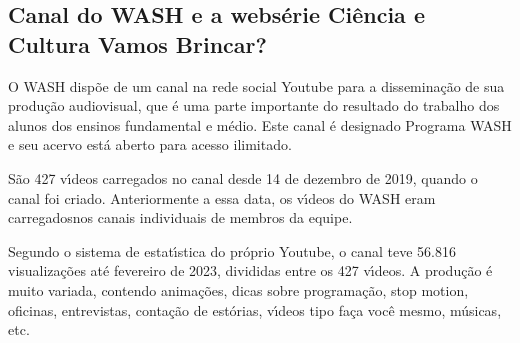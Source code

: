 \documentclass[
12pt,		%
openright,	%
twoside,  %
a4paper,			%
chapter=TITLE,		%
english,			%
french,				%
spanish,			%
brazil				%
]{USPSC-classe/USPSC}
\begin{document}
\subsection[Canal do WASH e a webs\'erie \textquotedbl Ci\^encia e Cultura Vamos Brincar?\textquotedbl ]{Canal do WASH e a webs\'erie \textquotedbl Ci\^encia e Cultura Vamos Brincar?\textquotedbl }\label{Canal do WASH e a webs\'erie \textquotedbl Ci\^encia e Cultura Vamos Brincar?\textquotedbl }
O WASH disp\~oe de um canal na rede social Youtube para a dissemina\c{c}\~ao de sua produ\c{c}\~ao audiovisual, que \'e uma parte importante do resultado do trabalho dos alunos dos ensinos fundamental e m\'edio. Este canal \'e designado \textquotedbl  Programa WASH \textquotedbl  e seu acervo est\'a aberto para acesso ilimitado.

















S\~ao 427 v\'{\i}deos carregados no canal desde 14 de dezembro de 2019, quando o canal foi criado. Anteriormente a essa data, os v\'{\i}deos do WASH eram \textquotedbl carregados\textquotedbl  nos canais individuais de membros da equipe.

















Segundo o sistema de estat\'{\i}stica do pr\'oprio Youtube, o canal teve 56.816 visualiza\c{c}\~oes at\'e fevereiro de 2023, divididas entre os 427 v\'{\i}deos. A produ\c{c}\~ao \'e muito variada, contendo anima\c{c}\~oes, dicas sobre programa\c{c}\~ao, \textquotedbl stop motion\textquotedbl , oficinas, entrevistas, conta\c{c}\~ao de est\'orias, v\'{\i}deos tipo \textquotedbl fa\c{c}a voc\^e mesmo\textquotedbl , m\'usicas, etc.
\end{document}

